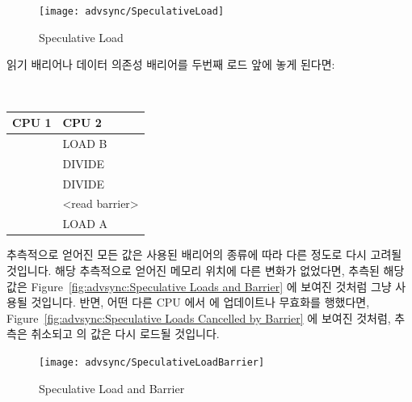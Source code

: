 \begin{enumerate}
\begin{figure}[htb]
\begin{center}
\texttt{[image: advsync/SpeculativeLoad]}
\end{center}
\caption{Speculative Load}
\end{figure}

읽기 배리어나 데이터 의존성 배리어를 두번째 로드 앞에 놓게 된다면:

\vspace{5pt}
\begin{minipage}[t]{\columnwidth}
\tt
\scriptsize
\begin{tabular}{l|p{1.5in}}
	CPU 1 &		CPU 2 \\
	\hline
		&	LOAD B \\
		&	DIVIDE \\
		&	DIVIDE \\
		&	<read barrier> \\
		&	LOAD A \\
\end{tabular}
\end{minipage}
\vspace{5pt}

추측적으로 얻어진 모든 값은 사용된 배리어의 종류에 따라 다른 정도로 다시 고려될
것입니다.
해당 추측적으로 얻어진 메모리 위치에 다른 변화가 없었다면, 추측된 해당 값은
Figure~\ref{fig:advsync:Speculative Loads and Barrier} 에 보여진 것처럼 그냥
사용될 것입니다.
반면, 어떤 다른 CPU 에서  에 업데이트나 무효화를 행했다면,
Figure~\ref{fig:advsync:Speculative Loads Cancelled by Barrier} 에 보여진
것처럼, 추측은 취소되고  의 값은 다시 로드될 것입니다.

\begin{figure}[htb]
\begin{center}
\texttt{[image: advsync/SpeculativeLoadBarrier]}
\end{center}
\caption{Speculative Load and Barrier}
\end{figure}


\end{enumerate}
